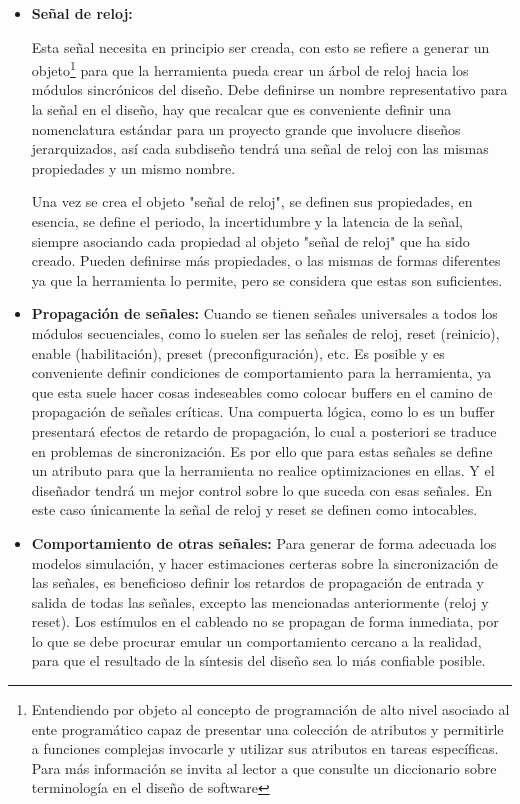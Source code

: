 \begin{itemize}
\item \textbf{Señal de reloj:} {Esta señal necesita en principio ser creada, con esto se refiere a generar un objeto\footnote{Entendiendo por objeto al concepto de programación de alto nivel asociado al ente programático capaz de presentar una colección de atributos y permitirle a funciones complejas invocarle y utilizar sus atributos en tareas específicas. Para más información se invita al lector a que consulte un diccionario sobre terminología en el diseño de software} para que la herramienta pueda crear un árbol de reloj hacia los módulos sincrónicos del diseño. Debe definirse un nombre representativo para la señal en el diseño, hay que recalcar que es conveniente definir una nomenclatura estándar para un proyecto grande que involucre diseños jerarquizados, así cada subdiseño tendrá una señal de reloj con las mismas propiedades y un mismo nombre.

Una vez se crea el objeto "señal de reloj", se definen sus propiedades, en esencia, se define el periodo, la incertidumbre y la latencia de la señal, siempre asociando cada propiedad al objeto "señal de reloj" que ha sido creado. Pueden definirse más propiedades, o las mismas de formas diferentes ya que la herramienta lo permite, pero se considera que estas son suficientes.}

\item \textbf{Propagación de señales:} {Cuando se tienen señales universales a todos los módulos secuenciales, como lo suelen ser las señales de reloj, reset (reinicio), enable (habilitación), preset (preconfiguración), etc. Es posible y es conveniente definir condiciones de comportamiento para la herramienta, ya que esta suele hacer cosas indeseables como colocar buffers en el camino de propagación de señales críticas. Una compuerta lógica, como lo es un buffer presentará efectos de retardo de propagación, lo cual a posteriori se traduce en problemas de sincronización. Es por ello que para estas señales se define un atributo para que la herramienta no realice optimizaciones en ellas. Y el diseñador tendrá un mejor control sobre lo que suceda con esas señales. En este caso únicamente la señal de reloj y reset se definen como intocables.}

\item \textbf{Comportamiento de otras señales:} {Para generar de forma adecuada los modelos simulación, y hacer estimaciones certeras sobre la sincronización de las señales, es beneficioso definir los retardos de propagación de entrada y salida de todas las señales, excepto las mencionadas anteriormente (reloj y reset). Los estímulos en el cableado no se propagan de forma inmediata, por lo que se debe procurar emular un comportamiento cercano a la realidad, para que el resultado de la síntesis del diseño sea lo más confiable posible.}


\end{itemize}
